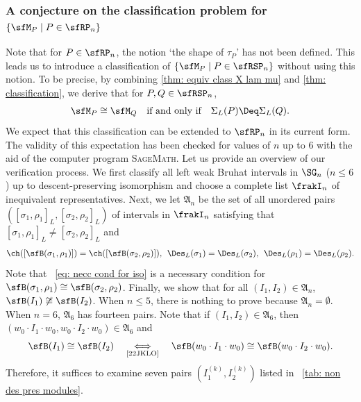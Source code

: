 \documentclass[12pt, reqno]{amsart}
\theoremstyle{definition}
\numberwithin{equation}{section} \numberwithin{figure}{section}
\numberwithin{table}{section}
\begin{document}
\subsubsection{A conjecture on the classification problem for $\{\sfM_P \mid P \in \sfRP_n \}$}\label{subsubsec: rem 2}


Note that for $P \in \sfRP_n$, the notion `the shape of $\tau_P$' has not been defined.
This leads us to introduce a 
classification of 
$\{\sfM_P \mid P \in \sfRSP_n\}$ without using this notion.
To be precise, by combining \cref{thm: equiv class X lam mu}
and \cref{thm: classification}, we derive that
for $P, Q \in \sfRSP_n$,
\begin{align}\label{eq: conj on class}
\sfM_P \cong \sfM_Q \quad \text{if and only if} \quad \Sigma_L(P) \Deq \Sigma_L(Q).
\end{align}
We expect that this classification can be extended  to $\sfRP_n$ in its current form.
The validity of this expectation has been checked for values of $n$ up to 6 with the aid of the computer program 
\textsc{SageMath}.
Let us provide an overview of our verification process.
We first classify all left weak Bruhat intervals in $\SG_n$ ($n \leq 6$) up to descent-preserving isomorphism and choose 
a complete list $\frakI_n$ of inequivalent representatives.
Next, we let $\mathfrak{A}_n$ be the set of all unordered pairs
$([\sigma_1, \rho_1]_L, [\sigma_2, \rho_2]_L)$ of intervals in  $\frakI_n$ satisfying that  $[\sigma_1, \rho_1]_L \neq [\sigma_2, \rho_2]_L$ and 
\begin{align}\label{eq: necc cond for iso}
\ch([\sfB(\sigma_1, \rho_1)]) = \ch([\sfB(\sigma_2, \rho_2)]), \;\, \Des_L(\sigma_1) = \Des_L(\sigma_2), \;\,  \Des_L(\rho_1) = \Des_L(\rho_2).
\end{align}
Note that ~\cref{eq: necc cond for iso} is a necessary condition for $\sfB(\sigma_1, \rho_1) \cong \sfB(\sigma_2, \rho_2)$.
Finally, we show that  for all $(I_1, I_2) \in \mathfrak{A}_n$, $\sfB(I_1) \not\cong \sfB(I_2)$.
When $n \leq 5$, there is nothing to prove because $\mathfrak{A}_n = \emptyset$.
When $n = 6$,
$\mathfrak{A}_6$ has fourteen pairs.
Note that 
if $(I_1, I_2) \in \mathfrak{A}_6$,  then $(w_0 \cdot I_1 \cdot {w_0}, w_0 \cdot I_2 \cdot {w_0}) \in \mathfrak{A}_6$ and 
\[
\sfB(I_1) \cong \sfB(I_2) \quad \underset{\text{\cite[Theorem 4]{22JKLO}}}{\Longleftrightarrow} \quad \sfB(w_0 \cdot I_1 \cdot w_0) \cong \sfB(w_0 \cdot I_2 \cdot w_0). 
\]
Therefore, it suffices to examine seven pairs $(I_1^{(k)}, I_2^{(k)})$ listed in ~\cref{tab: non des pres modules}.
\end{document}

